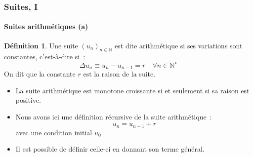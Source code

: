 \documentclass[10pt,notheorems]{beamer}
\theoremstyle{plain}
\theoremstyle{definition} %
\newtheorem{definition}{Définition}
\begin{document}
\begin{frame}
  \frametitle{Suites, I}
  \framesubtitle{Suites arithmétiques (a)}
  \hypertarget{slide_suites_arithmetiques_1}{}

  \bigskip

  \begin{definition}
    Une suite $(u_n)_{n\in\mathbb N}$ est dite arithmétique si ses variations sont constantes, c'est-à-dire si~:
    \[
      \Delta u_n \equiv u_n-u_{n-1} = r\quad \forall n\in\mathbb N^{\star}
    \]
    On dit que la constante $r$ est la raison de la suite.
  \end{definition}

  \bigskip

  \begin{itemize}

  \item La suite arithmétique est monotone croissante si et seulement si sa raison est positive.\newline

  \item Nous avons ici une définition récursive de la suite arithmétique~:
    \[
      u_n = u_{n-1} + r
    \]
    avec une condition initial $u_0$.\newline

  \item Il est possible de définir celle-ci en donnant son terme général.\newline

  \end{itemize}

\end{frame}
\end{document}
